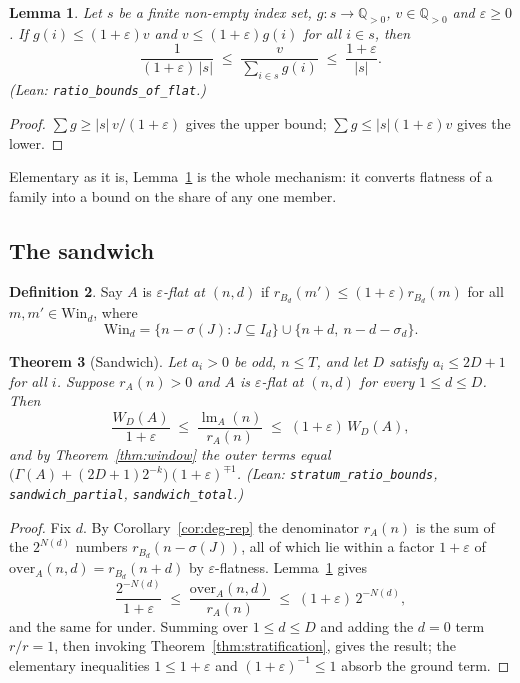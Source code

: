 \documentclass[11pt,a4paper]{article}
\theoremstyle{plain}
\newtheorem{theorem}{Theorem}[section]
\newtheorem{lemma}[theorem]{Lemma}
\theoremstyle{definition}
\newtheorem{definition}[theorem]{Definition}
\theoremstyle{remark}
\DeclareMathOperator{\lm}{lm}
\newcommand{\ovr}{\mathrm{over}}
\newcommand{\undr}{\mathrm{under}}
\newcommand{\Lean}[1]{\texttt{#1}}
\begin{document}
\begin{lemma}\label{lem:flat-ratio}
Let $s$ be a finite non-empty index set, $g:s\to\mathbb{Q}_{>0}$,
$v\in\mathbb{Q}_{>0}$ and $\varepsilon\ge0$. If $g(i)\le(1+\varepsilon)v$ and
$v\le(1+\varepsilon)g(i)$ for all $i\in s$, then
\[
  \frac{1}{(1+\varepsilon)\,|s|}\;\le\;\frac{v}{\sum_{i\in s}g(i)}\;\le\;\frac{1+\varepsilon}{|s|}.
\]
\textup{(Lean: \Lean{ratio\_bounds\_of\_flat}.)}
\end{lemma}

\begin{proof}
$\sum g\ge|s|\,v/(1+\varepsilon)$ gives the upper bound;
$\sum g\le|s|(1+\varepsilon)v$ gives the lower.
\end{proof}

Elementary as it is, Lemma~\ref{lem:flat-ratio} is the whole mechanism: it
converts flatness of a family into a bound on the share of any one member.

\subsection{The sandwich}

\begin{definition}\label{def:flat}
Say $A$ is \emph{$\varepsilon$-flat at $(n,d)$} if
$r_{B_d}(m')\le(1+\varepsilon)r_{B_d}(m)$ for all $m,m'\in\mathrm{Win}_d$, where
\[
  \mathrm{Win}_d=\{n-\sigma(J):J\subseteq I_d\}\cup\{n+d,\ n-d-\sigma_d\}.
\]
\end{definition}

\begin{theorem}[Sandwich]\label{thm:sandwich}
Let $a_i>0$ be odd, $n\le T$, and let $D$ satisfy $a_i\le2D+1$ for all $i$.
Suppose $r_A(n)>0$ and $A$ is $\varepsilon$-flat at $(n,d)$ for every
$1\le d\le D$. Then
\[
  \frac{W_D(A)}{1+\varepsilon}\;\le\;\frac{\lm_A(n)}{r_A(n)}\;\le\;(1+\varepsilon)\,W_D(A),
\]
and by Theorem~\ref{thm:window} the outer terms equal
$\bigl(\Gamma(A)+(2D+1)2^{-k}\bigr)(1+\varepsilon)^{\mp1}$.
\textup{(Lean: \Lean{stratum\_ratio\_bounds}, \Lean{sandwich\_partial},
\Lean{sandwich\_total}.)}
\end{theorem}

\begin{proof}
Fix $d$. By Corollary~\ref{cor:deg-rep} the denominator $r_A(n)$ is the sum
of the $2^{N(d)}$ numbers $r_{B_d}(n-\sigma(J))$, all of which lie within a
factor $1+\varepsilon$ of $\ovr_A(n,d)=r_{B_d}(n+d)$ by $\varepsilon$-flatness.
Lemma~\ref{lem:flat-ratio} gives
\[
  \frac{2^{-N(d)}}{1+\varepsilon}\;\le\;\frac{\ovr_A(n,d)}{r_A(n)}\;\le\;(1+\varepsilon)\,2^{-N(d)},
\]
and the same for $\undr$. Summing over $1\le d\le D$ and adding the $d=0$ term
$r/r=1$, then invoking Theorem~\ref{thm:stratification}, gives the result;
the elementary inequalities $1\le1+\varepsilon$ and $(1+\varepsilon)^{-1}\le1$
absorb the ground term.
\end{proof}
\end{document}
